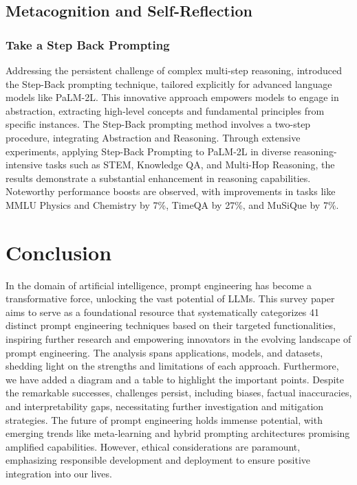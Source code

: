\documentclass{article}
\begin{document}
\subsection{Metacognition and Self-Reflection}
\label{mas}
\subsubsection{Take a Step Back Prompting}
\label{tsbp}
Addressing the persistent challenge of complex multi-step reasoning, \cite{zheng2023take} introduced the Step-Back prompting technique, tailored explicitly for advanced language models like PaLM-2L. This innovative approach empowers models to engage in abstraction, extracting high-level concepts and fundamental principles from specific instances. The Step-Back prompting method involves a two-step procedure, integrating Abstraction and Reasoning. Through extensive experiments, applying Step-Back Prompting to PaLM-2L in diverse reasoning-intensive tasks such as STEM, Knowledge QA, and Multi-Hop Reasoning, the results demonstrate a substantial enhancement in reasoning capabilities. Noteworthy performance boosts are observed, with improvements in tasks like MMLU Physics and Chemistry by 7\%, TimeQA by 27\%, and MuSiQue by 7\%.



\section{Conclusion}
In the domain of artificial intelligence, prompt engineering has become a transformative force, unlocking the vast potential of LLMs. This survey paper aims to serve as a foundational resource that systematically categorizes 41 distinct prompt engineering techniques based on their targeted functionalities, inspiring further research and empowering innovators in the evolving landscape of prompt engineering. The analysis spans applications, models, and datasets, shedding light on the strengths and limitations of each approach. Furthermore, we have added a diagram and a table to highlight the important points. Despite the remarkable successes, challenges persist, including biases, factual inaccuracies, and interpretability gaps, necessitating further investigation and mitigation strategies. The future of prompt engineering holds immense potential, with emerging trends like meta-learning and hybrid prompting architectures promising amplified capabilities. However, ethical considerations are paramount, emphasizing responsible development and deployment to ensure positive integration into our lives.
\end{document}
